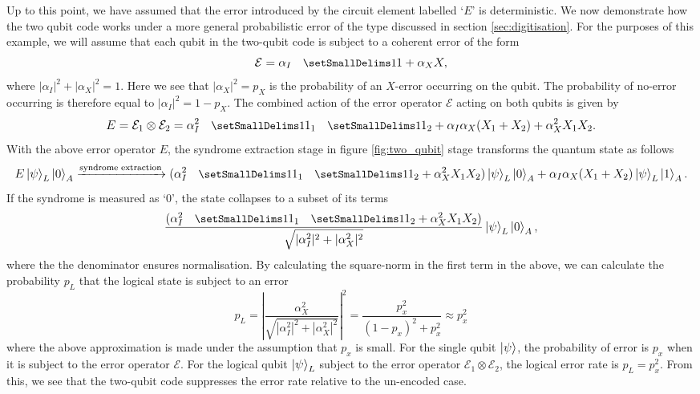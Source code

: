 \documentclass[]{arxiv}
\theoremstyle{plain}%
\theoremstyle{definition}
\theoremstyle{remark}
\DeclareRobustCommand\openone{\leavevmode\hbox{\small1\normalsize\kern-.33em1}}
\begin{document}
Up to this point, we have assumed that the error introduced by the circuit element labelled `$E$' is deterministic. We now demonstrate how the two qubit code works under a more general probabilistic error of the type discussed in section \ref{sec:digitisation}. For the purposes of this example, we will assume that each qubit in the two-qubit code is subject to a coherent error of the form 
%
\begin{equation}
\mathcal{E}=\alpha_{I}\openone+\alpha_X X\rm,
\end{equation}
%
where $|\alpha_{I}|^2+|\alpha_X|^2=1$. Here we see that $|\alpha_X|^2=p_X$ is the probability of an $X$-error occurring on the qubit. The probability of no-error occurring is therefore equal to $|\alpha_I|^2=1-p_X$. The combined action of the error operator $\mathcal{E}$ acting on both qubits is given by
%
\begin{equation}
E=\mathcal{E}_1\otimes\mathcal{E}_2=\alpha_I^2\openone_1 \openone_2 + \alpha_I\alpha_X(X_1+X_2)+\alpha_X^2 X_1X_2\rm.
\end{equation}
%
With the above error operator $E$, the syndrome extraction stage in figure \ref{fig:two_qubit} stage transforms the quantum state as follows
%
\begin{equation} \label{eq:synd_extract_prob}
E\ket{\psi}_L \ket{0}_A \xrightarrow[]{\text{syndrome extraction}} (\alpha_I^2\openone_1 \openone_2 +\alpha_X^2 X_1X_2)\ket{\psi}_L\ket{0}_A + \alpha_I\alpha_X(X_1+X_2)\ket{\psi}_L\ket{1}_A\rm.
\end{equation}
%
If the syndrome is measured as `$0$', the state collapses to a subset of its terms 
%
\begin{equation} \label{eq:synd_extract_prob_collapse}
 \dfrac{(\alpha_I^2\openone_1 \openone_2 +\alpha_X^2 X_1X_2)}{\sqrt{|\alpha_I^2|^2+|\alpha_X^2|^2}}\ket{\psi}_L\ket{0}_A\rm,
\end{equation}
%
where the the denominator ensures normalisation. By calculating the square-norm in the first term in the above, we can calculate the probability $p_L$ that the logical state is subject to an error
%
\begin{equation}
p_L=\left|\dfrac{\alpha_X^2}{\sqrt{|\alpha_I^2|^2+|\alpha_X^2|^2}}\right|^2=\dfrac{p_x^2}{(1-p_x)^2+p_x^2}\approx p_x^2
\end{equation}
%
where the above approximation is made under the assumption that $p_x$ is small. For the single qubit $\ket{\psi}$, the probability of error is $p_x$ when it is subject to the error operator $\mathcal{E}$. For the logical qubit $\ket{\psi}_L$ subject to the error operator $\mathcal{E}_1\otimes\mathcal{E}_2$, the logical error rate is $p_L=p_x^2$. From this, we see that the two-qubit code suppresses the error rate relative to the un-encoded case. 
 
\end{document}
